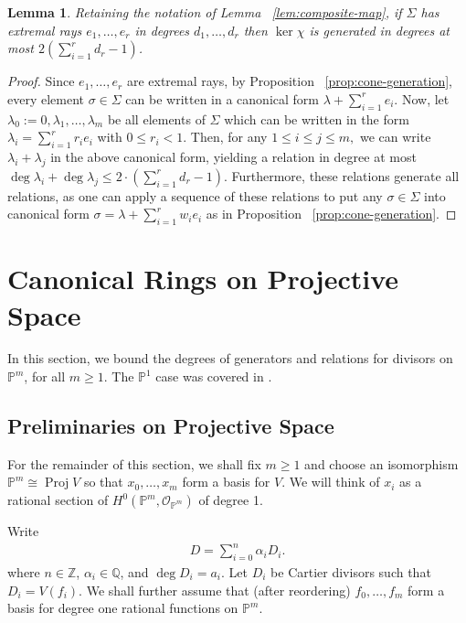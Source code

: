 \documentclass{amsart}
\theoremstyle{plain}
\newtheorem{lem}[thm]{Lemma}
\theoremstyle{definition}
\theoremstyle{remark}
\numberwithin{equation}{section}
\newcommand\ssec{\subsection}
\newcommand\bq{{\mathbb Q}}
\newcommand\bp{{\mathbb P}}
\newcommand\bz{{\mathbb Z}}
\newcommand\sco{{\mathscr O}}
\newcommand\bida{a}
\DeclareMathOperator{\proj}{Proj}
\begin{document}
\begin{lem}
\label{lem:bound-ker-chi}
Retaining the notation of Lemma ~\ref{lem:composite-map}, if $\Sigma$ has
extremal rays $e_1,\ldots, e_r$ in degrees $d_1, \ldots, d_r$ then $\ker \chi$
is generated in degrees at most $2(\sum_{i=1}^{r}d_r-1)$.
\end{lem}
\begin{proof}
Since $e_1, \ldots, e_r$ are extremal rays, by Proposition
~\ref{prop:cone-generation}, every element $\sigma \in \Sigma$ can be written
in a canonical form $\lambda + \sum_{i=1}^{r}e_i$. Now, let $\lambda_0 :=
0,\lambda_1, \ldots, \lambda_m$ be all elements of $\Sigma$ which can be
written in the form $\lambda_i = \sum_{i=1}^{r}r_i e_i$ with $0 \leq r_i < 1.$
Then, for any $1 \leq i \leq j \leq m,$ we can write $\lambda_i + \lambda_j$ in
the above canonical form, yielding a relation in degree at most $\deg \lambda_i
+ \deg \lambda_j \leq 2 \cdot \left( \sum_{i=1}^{r}d_r -1 \right).$
Furthermore, these relations generate all relations, as one can apply a
sequence of these relations to put any $\sigma \in \Sigma$ into canonical form
$\sigma = \lambda + \sum_{i=1}^{r}w_i e_i$ as in Proposition
~\ref{prop:cone-generation}.
\end{proof}


\section{Canonical Rings on Projective Space}
\label{sec:proj}
In this section, we bound the degrees of generators and relations for divisors
on $\bp^m$, for all $m \geq 1$. The $\bp^1$ case was covered in
\cite{dorney:canonical}.

\ssec{Preliminaries on Projective Space}

For the remainder of this section, we shall fix $m \geq 1$ and choose an
isomorphism $\bp^m \cong \proj V$ so that $x_0,\ldots, x_m$ form a basis for
$V$.  We will think of $x_i$ as a rational section of $H^0(\bp^m,
\sco_{\bp^m})$ of degree 1.

Write
\begin{align*}
	D = \sum_{i=0}^{n}\alpha_i D_i.
\end{align*}
where $n \in \bz$, $\alpha_i \in \bq$, and $\deg D_i = \bida_i$. Let $D_i$ be
Cartier divisors such that $D_i = V(f_i)$.
We shall further assume that (after reordering) $f_0,\ldots, f_{m}$ form a
basis for degree one rational functions on $\bp^m$.
\end{document}
